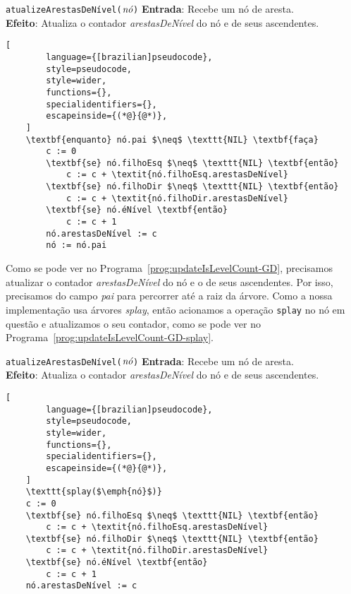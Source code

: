 \begin{programruledcaption}{\texttt{atualizeArestasDeNível($\emph{nó}$)} \label{prog:updateIsLevelCount-GD}}
    \noindent\textbf{Entrada}: Recebe um nó de aresta.\\
    \noindent\textbf{Efeito}: Atualiza o contador \textit{arestasDeNível} do nó e de seus ascendentes.
    \vspace{-0.5\baselineskip}
    \begin{lstlisting}[
        language={[brazilian]pseudocode},
        style=pseudocode,
        style=wider,
        functions={},
        specialidentifiers={},
        escapeinside={(*@}{@*)},
    ]
    \textbf{enquanto} nó.pai $\neq$ \texttt{NIL} \textbf{faça}
        c := 0
        \textbf{se} nó.filhoEsq $\neq$ \texttt{NIL} \textbf{então}
            c := c + \textit{nó.filhoEsq.arestasDeNível}
        \textbf{se} nó.filhoDir $\neq$ \texttt{NIL} \textbf{então}
            c := c + \textit{nó.filhoDir.arestasDeNível}
        \textbf{se} nó.éNível \textbf{então}
            c := c + 1
        nó.arestasDeNível := c
        nó := nó.pai
\end{lstlisting}
\vspace{-0.5\baselineskip}
\end{programruledcaption}

Como se pode ver no Programa~\ref{prog:updateIsLevelCount-GD}, precisamos atualizar o contador \textit{arestasDeNível} do nó e o de seus ascendentes. Por isso, precisamos do campo \textit{pai} para percorrer até a raiz da árvore. Como a nossa implementação usa árvores \textit{splay}, então acionamos a operação \texttt{splay} no nó em questão e atualizamos o seu contador, como se pode ver no Programa~\ref{prog:updateIsLevelCount-GD-splay}.

\begin{programruledcaption}{\texttt{atualizeArestasDeNível($\emph{nó}$)} \label{prog:updateIsLevelCount-GD-splay}}
    \noindent\textbf{Entrada}: Recebe um nó de aresta.\\
    \noindent\textbf{Efeito}: Atualiza o contador \textit{arestasDeNível} do nó e de seus ascendentes.
    \vspace{-0.5\baselineskip}
    \begin{lstlisting}[
        language={[brazilian]pseudocode},
        style=pseudocode,
        style=wider,
        functions={},
        specialidentifiers={},
        escapeinside={(*@}{@*)},
    ]
    \texttt{splay($\emph{nó}$)}
    c := 0
    \textbf{se} nó.filhoEsq $\neq$ \texttt{NIL} \textbf{então}
        c := c + \textit{nó.filhoEsq.arestasDeNível}
    \textbf{se} nó.filhoDir $\neq$ \texttt{NIL} \textbf{então}
        c := c + \textit{nó.filhoDir.arestasDeNível}
    \textbf{se} nó.éNível \textbf{então}
        c := c + 1
    nó.arestasDeNível := c
\end{lstlisting}
\vspace{-0.5\baselineskip}
\end{programruledcaption}

